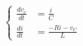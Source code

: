 \documentclass[preview]{standalone}
\begin{document}
\begin{center}
\[
                    \left\{
                    \begin{aligned}
                        \frac{dv_c}{dt} &= \frac{i}{C} \\
                        \frac{di}{dt} &= \frac{-Ri - v_C}{L}
                    \end{aligned}
                    \right.
                    \]
\end{center}
\end{document}
